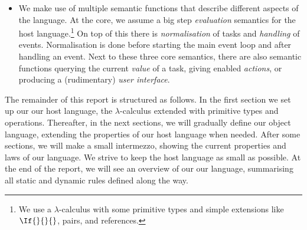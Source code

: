 \begin{itemize}
    but \emph{only} a continuation.
    Obtaining the current value of a task is an \emph{observation},
    implemented by an additional semantic function.\footnote{
      Looking at tasks in this way mitigates the problem of a stream-like type which can not be made into a monad
      (as described in \textcite{theses/radboud/VinterHviid18})
      and make sure some tasks, such as a step, do not have a value.
    }
  \item
    We make use of multiple semantic functions that describe different aspects of the language.
    At the core, we assume a big step \emph{evaluation} semantics for the host language.\footnote{
      We use a $\lambda$-calculus with some primitive types and simple extensions like $\If{}{}{}$, pairs, and references.}
    On top of this there is \emph{normalisation} of tasks
    and \emph{handling} of events.
    Normalisation is done before starting the main event loop
    and after handling an event.
    Next to these three core semantics,
    there are also semantic functions querying the current \emph{value} of a task,
    giving enabled \emph{actions},
    or producing a (rudimentary) \emph{user interface}.
\end{itemize}

The remainder of this report is structured as follows.
In the first section we set up our our host language,
the $\lambda$-calculus extended with primitive types and operations.
Thereafter, in the next  sections, we will gradually define our object language,
extending the properties of our host language when needed.
After some sections,
we will make a small intermezzo,
showing the current properties and laws of our language.
We strive to keep the host language as small as possible.
At the end of the report,
we will see an overview of our our language,
summarising all static and dynamic rules defined along the way.
